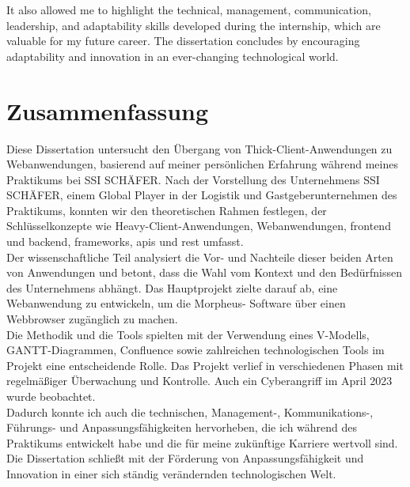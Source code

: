 \documentclass[a4paper, 12pt, french]{article}
\begin{document}
			It also allowed me to highlight the technical, management, communication, leadership, and adaptability skills developed during the internship, which are valuable for my future career. The dissertation concludes by encouraging adaptability and innovation in an ever-changing technological world.

		\section*{Zusammenfassung}
			Diese Dissertation untersucht den Übergang von Thick-Client-Anwendungen zu Webanwendungen, basierend auf meiner persönlichen Erfahrung während meines Praktikums bei SSI SCHÄFER. Nach der Vorstellung des Unternehmens SSI SCHÄFER, einem Global Player in der Logistik und Gastgeberunternehmen  des Praktikums, konnten wir den theoretischen Rahmen festlegen, der Schlüsselkonzepte wie Heavy-Client-Anwendungen, Webanwendungen, \Gls{frontend} und \Gls{backend}, \Glspl{framework}, \acrshort{api}s und \acrshort{rest} umfasst.\\

			Der wissenschaftliche Teil analysiert die Vor- und Nachteile dieser beiden Arten von Anwendungen und betont, dass die Wahl vom Kontext und den Bedürfnissen des Unternehmens abhängt. Das Hauptprojekt zielte darauf ab, eine Webanwendung zu entwickeln, um die Morpheus- Software über einen Webbrowser zugänglich zu machen.\\

			Die Methodik und die Tools spielten mit der Verwendung eines V-Modells, GANTT-Diagrammen, Confluence sowie zahlreichen technologischen Tools im Projekt eine entscheidende Rolle. Das Projekt verlief in verschiedenen Phasen mit regelmäßiger Überwachung und Kontrolle. Auch ein Cyberangriff im April 2023 wurde beobachtet.\\

			Dadurch konnte ich auch die technischen, Management-, Kommunikations-, Führungs- und Anpassungsfähigkeiten hervorheben, die ich während des Praktikums entwickelt habe und die für meine zukünftige Karriere wertvoll sind. Die Dissertation schließt mit der Förderung von Anpassungsfähigkeit und Innovation in einer sich ständig verändernden technologischen Welt.  
\end{document}
